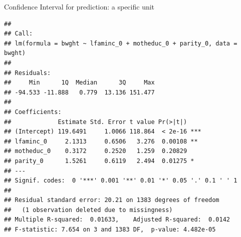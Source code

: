 \documentclass[
  ignorenonframetext,
]{beamer}
\newenvironment{Shaded}{\begin{snugshade}}{\end{snugshade}}
\newcommand{\CommentTok}[1]{\textcolor[rgb]{0.56,0.35,0.01}{\textit{#1}}}
\newcommand{\DecValTok}[1]{\textcolor[rgb]{0.00,0.00,0.81}{#1}}
\newcommand{\FloatTok}[1]{\textcolor[rgb]{0.00,0.00,0.81}{#1}}
\newcommand{\FunctionTok}[1]{\textcolor[rgb]{0.00,0.00,0.00}{#1}}
\newcommand{\NormalTok}[1]{#1}
\newcommand{\OtherTok}[1]{\textcolor[rgb]{0.56,0.35,0.01}{#1}}
\newcommand{\SpecialCharTok}[1]{\textcolor[rgb]{0.00,0.00,0.00}{#1}}
\begin{document}
\begin{frame}[fragile]{Confidence Interval for prediction: a specific
unit}
\protect\hypertarget{confidence-interval-for-prediction-a-specific-unit-6}{}
\tiny

\begin{Shaded}
\end{Shaded}

\begin{verbatim}
## 
## Call:
## lm(formula = bwght ~ lfaminc_0 + motheduc_0 + parity_0, data = bwght)
## 
## Residuals:
##     Min      1Q  Median      3Q     Max 
## -94.533 -11.888   0.779  13.136 151.477 
## 
## Coefficients:
##             Estimate Std. Error t value Pr(>|t|)    
## (Intercept) 119.6491     1.0066 118.864  < 2e-16 ***
## lfaminc_0     2.1313     0.6506   3.276  0.00108 ** 
## motheduc_0    0.3172     0.2520   1.259  0.20829    
## parity_0      1.5261     0.6119   2.494  0.01275 *  
## ---
## Signif. codes:  0 '***' 0.001 '**' 0.01 '*' 0.05 '.' 0.1 ' ' 1
## 
## Residual standard error: 20.21 on 1383 degrees of freedom
##   (1 observation deleted due to missingness)
## Multiple R-squared:  0.01633,    Adjusted R-squared:  0.0142 
## F-statistic: 7.654 on 3 and 1383 DF,  p-value: 4.482e-05
\end{verbatim}
\end{frame}
\end{document}
